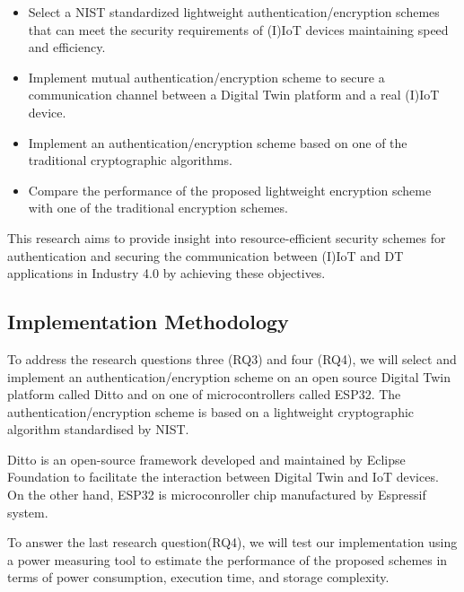 \begin{itemize}

    \item Select a NIST standardized lightweight authentication/encryption schemes that can meet the security requirements of (I)IoT devices maintaining speed and efficiency.

    \item Implement mutual authentication/encryption scheme to secure a communication channel between a Digital Twin platform and a real (I)IoT device. 
    
    \item Implement an authentication/encryption scheme based on one of the traditional cryptographic algorithms. 

    \item Compare the performance of the proposed lightweight encryption scheme with one of the traditional encryption schemes.

\end{itemize}
This research aims to provide insight into resource-efficient security schemes for authentication and securing the communication between  (I)IoT  and DT applications in Industry 4.0 by achieving these objectives.




\subsection{Implementation Methodology}
To address the research questions three (RQ3) and four (RQ4), we will select and implement an authentication/encryption scheme on
an open source Digital Twin platform called Ditto and on one of microcontrollers called ESP32. The authentication/encryption scheme is based on a lightweight cryptographic algorithm standardised by NIST. 

Ditto is an open-source framework developed and maintained by Eclipse Foundation to facilitate the interaction between Digital Twin and IoT devices\cite{noauthor_eclipse_nodate}. On the other hand, ESP32 is microconroller chip manufactured by Espressif system. 

To answer the last research question(RQ4), we will test our implementation
using a power measuring tool to estimate the performance of the proposed schemes in terms of power
consumption, execution time, and storage complexity. 

